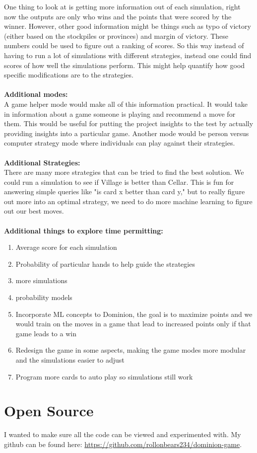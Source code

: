 \documentclass[11pt, oneside]{article}   	%
\begin{document}
One thing to look at is getting more information out of each simulation, right now the outputs are only who wins and the points that were scored by the winner. However, other good information might be things such as typo of victory (either based on the stockpiles or provinces) and margin of victory. These numbers could be used to figure out a ranking of scores. So this way instead of having to run a lot of simulations with different strategies, instead one could find scores of how well the simulations perform. This might help quantify how good specific modifications are to the strategies. 
\\
\\
\textbf{Additional modes:}\\
A game helper mode would make all of this information practical. It would take in information about a game someone is playing and recommend a move for them. This would be useful for putting the project insights to the test by actually providing insights into a particular game. Another mode would be person versus computer strategy mode where individuals can play against their strategies. 
\\
\\
\textbf{Additional Strategies:}\\
There are many more strategies that can be tried to find the best solution. We could run a simulation to see if Village is better than Cellar. This is fun for answering simple queries like "is card x better than card y," but to really figure out more into an optimal strategy, we need to do more machine learning to figure out our best moves. 
\\
\\
\textbf{Additional things to explore time permitting:}\\
	\begin{enumerate}
 		 \item Average score for each simulation
		 \item Probability of particular hands to help guide the strategies
		 \item more simulations
		 \item probability models
		 \item Incorporate ML concepts  to Dominion, the goal is to maximize points and we would train on the moves in a game that lead to increased points only if that game leads to a win
		 \item Redesign the game in some aspects, making the game modes more modular and the simulations easier to adjust
		 \item Program more cards to auto play so simulations still work
	\end{enumerate}
	

\section{Open Source}

I wanted to make sure all the code can be viewed and experimented with. My github can be found here: \url{https://github.com/rollonbears234/dominion-game}. 



\end{document}
